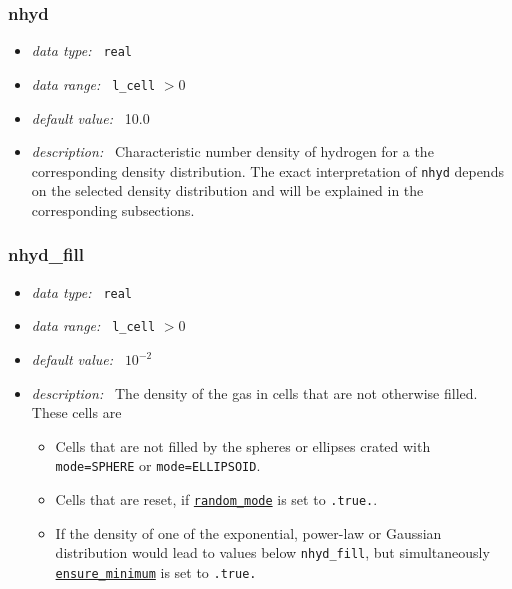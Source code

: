 \documentclass[a4paper,10pt]{article}
\begin{document}
\subsubsection{nhyd}
\label{hydopt:nhyd}
\begin{itemize}
 \item \textit{data type:~} \texttt{real}
 \item \textit{data range:~} \texttt{l\_cell} $> 0$
 \item \textit{default value:~} 10.0
 \item \textit{description:~} Characteristic number density of hydrogen for a
  the corresponding density distribution. The exact interpretation of 
  \texttt{nhyd} depends on the selected density distribution and will be 
  explained in the corresponding subsections.
\end{itemize}

\subsubsection{nhyd\_fill}
\label{hydopt:nhydfill}
\begin{itemize}
 \item \textit{data type:~} \texttt{real}
 \item \textit{data range:~} \texttt{l\_cell} $> 0$
 \item \textit{default value:~} $10^{-2}$
 \item \textit{description:~} The density of the gas in cells that are not 
 otherwise filled. These cells are 
 \begin{itemize}
  \item Cells that are not filled by the spheres or ellipses crated with
   \texttt{mode=SPHERE} or \texttt{mode=ELLIPSOID}.
  \item Cells that are reset, if 
   \hyperref[hydopt:randommode]{\texttt{random\_mode}} is set to 
   \texttt{.true.}.
  \item If the density of one of the exponential, power-law or Gaussian 
   distribution would lead to values below \texttt{nhyd\_fill}, but 
   simultaneously 
   \hyperref[hydopt:ensureminimum]{\texttt{ensure\_minimum}} is set to 
   \texttt{.true.}
 \end{itemize}  
\end{itemize}
\end{document}
